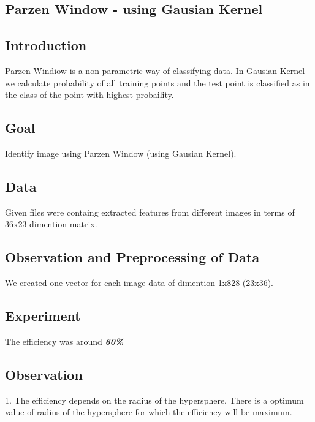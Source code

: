 \begin{center}
\section{Parzen Window - using Gausian Kernel}
\end{center}

\subsection{Introduction}
\begin{flushleft}
 Parzen Windiow is a non-parametric way of classifying data. In Gausian Kernel we calculate probability 
 of all training points and the test point is classified as in the class of the point with highest probaility.
\end{flushleft}

\subsection{Goal}
\begin{flushleft}
    Identify image using Parzen Window (using Gausian Kernel).
\end{flushleft}

\subsection{Data}
\begin{flushleft}
    Given files were containg extracted features from different images in terms of 36x23 dimention matrix.
\end{flushleft}


\subsection{Observation and Preprocessing of Data}
\begin{flushleft}
  We created one vector for each image data of dimention 1x828 (23x36).
\end{flushleft}

\subsection{Experiment}
\begin{flushleft}
  The efficiency was around \textbf{\textit{60\%}}
\end{flushleft}

\subsection{Observation}
\begin{flushleft}
  1. The efficiency depends on the radius of the hypersphere.
  There is a optimum value of radius of the hypersphere for which the efficiency will be maximum.
\end{flushleft}
